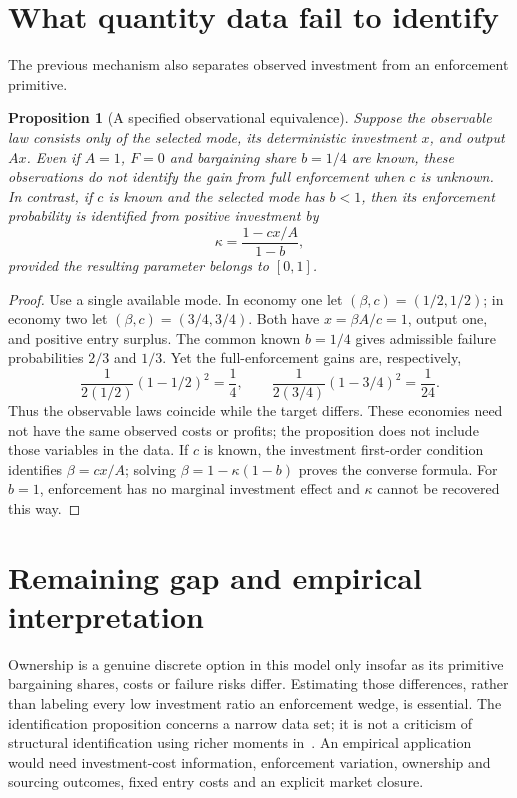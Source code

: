 \documentclass[11pt,a4paper]{article}
\newtheorem{proposition}[theorem]{Proposition}
\theoremstyle{definition}
\theoremstyle{remark}
\begin{document}
\section{What quantity data fail to identify}
The previous mechanism also separates observed investment from an enforcement primitive.

\begin{proposition}[A specified observational equivalence]\label{pr:identification}
Suppose the observable law consists only of the selected mode, its deterministic investment $x$, and output $Ax$. Even if $A=1$, $F=0$ and bargaining share $b=1/4$ are known, these observations do not identify the gain from full enforcement when $c$ is unknown. In contrast, if $c$ is known and the selected mode has $b<1$, then its enforcement probability is identified from positive investment by
\[
 \kappa=\frac{1-cx/A}{1-b},
\]
provided the resulting parameter belongs to $[0,1]$.
\end{proposition}
\begin{proof}
Use a single available mode. In economy one let $(\beta,c)=(1/2,1/2)$; in economy two let $(\beta,c)=(3/4,3/4)$. Both have $x=\beta A/c=1$, output one, and positive entry surplus. The common known $b=1/4$ gives admissible failure probabilities $2/3$ and $1/3$. Yet the full-enforcement gains are, respectively,
\[
 \frac{1}{2(1/2)}(1-1/2)^2=\frac14,
 \qquad
 \frac{1}{2(3/4)}(1-3/4)^2=\frac1{24}.
\]
Thus the observable laws coincide while the target differs. These economies need not have the same observed costs or profits; the proposition does not include those variables in the data. If $c$ is known, the investment first-order condition identifies $\beta=cx/A$; solving $\beta=1-\kappa(1-b)$ proves the converse formula. For $b=1$, enforcement has no marginal investment effect and $\kappa$ cannot be recovered this way.
\end{proof}

\section{Remaining gap and empirical interpretation}
Ownership is a genuine discrete option in this model only insofar as its primitive bargaining shares, costs or failure risks differ. Estimating those differences, rather than labeling every low investment ratio an enforcement wedge, is essential. The identification proposition concerns a narrow data set; it is not a criticism of structural identification using richer moments in~\cite{cm}. An empirical application would need investment-cost information, enforcement variation, ownership and sourcing outcomes, fixed entry costs and an explicit market closure.
\end{document}

